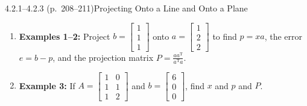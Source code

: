\documentclass[11pt,a4paper,openany,oneside]{book}
\def\vect#1{#1}%
\def\uv#1{#1}%
\def\mathbf#1{#1}%
\newcommand{\vect}[1]{\mathbf{#1}}
\newcommand{\uv}[1]{\hat{\mathbf{#1}}}
\newcommand{\T}{\mathrm{T}}
\numberwithin{equation}{chapter}
\begin{document}
\begin{example}{4.2.1--4.2.3 (p.\ 208--211)}{Projecting Onto a Line and Onto a Plane}
\begin{enumerate}
\item \textbf{Examples 1--2:} Project $\vect{b} = \begin{bmatrix}1\\1\\1\end{bmatrix}$ onto $\vect{a} = \begin{bmatrix}1\\2\\2\end{bmatrix}$ to find $\vect{p} = \uv{x}\vect{a}$, the error $\vect{e} = \vect{b}-\vect{p}$, and the projection matrix $P = \frac{\vect{a}\vect{a}^\T}{\vect{a}^\T\vect{a}}$.
\item \textbf{Example 3:} If $A = \begin{bmatrix}1 & 0\\1 & 1\\1 & 2\end{bmatrix}$ and $\vect{b} = \begin{bmatrix}6\\0\\0\end{bmatrix}$, find $\uv{\vect{x}}$ and $\vect{p}$ and $P$.
\end{enumerate}
\end{example}
\end{document}
